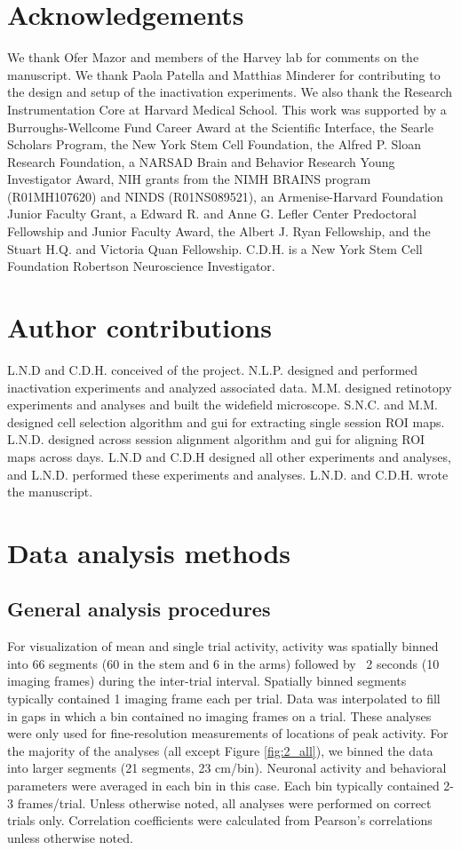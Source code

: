 \section{Acknowledgements}
We thank Ofer Mazor and members of the Harvey lab for comments on the manuscript. We thank Paola Patella and Matthias Minderer for contributing to the design and setup of the inactivation experiments. We also thank the Research Instrumentation Core at Harvard Medical School. This work was supported by a Burroughs-Wellcome Fund Career Award at the Scientific Interface, the Searle Scholars Program, the New York Stem Cell Foundation, the Alfred P. Sloan Research Foundation, a NARSAD Brain and Behavior Research Young Investigator Award, NIH grants from the NIMH BRAINS program (R01MH107620) and NINDS (R01NS089521), an Armenise-Harvard Foundation Junior Faculty Grant, a Edward R. and Anne G. Lefler Center Predoctoral Fellowship and Junior Faculty Award, the Albert J. Ryan Fellowship, and the Stuart H.Q. and Victoria Quan Fellowship. C.D.H. is a New York Stem Cell Foundation Robertson Neuroscience Investigator. 

\section{Author contributions}
L.N.D and C.D.H. conceived of the project. N.L.P. designed and performed inactivation experiments and analyzed associated data. M.M. designed retinotopy experiments and analyses and built the widefield microscope. S.N.C. and M.M. designed cell selection algorithm and gui for extracting single session ROI maps. L.N.D. designed across session alignment algorithm and gui for aligning ROI maps across days. L.N.D and C.D.H designed all other experiments and analyses, and L.N.D. performed these experiments and analyses. L.N.D. and C.D.H. wrote the manuscript. 

\section{Data analysis methods}
\subsection{General analysis procedures}
For visualization of mean and single trial activity, activity was spatially binned into 66 segments (60 in the stem and 6 in the arms) followed by ~2 seconds (10 imaging frames) during the inter-trial interval. Spatially binned segments typically contained 1 imaging frame each per trial. Data was interpolated to fill in gaps in which a bin contained no imaging frames on a trial. These analyses were only used for fine-resolution measurements of locations of peak activity. For the majority of the analyses (all except Figure \ref{fig:2_all}), we binned the data into larger segments (21 segments, 23 cm/bin). Neuronal activity and behavioral parameters were averaged in each bin in this case. Each bin typically contained 2-3 frames/trial. Unless otherwise noted, all analyses were performed on correct trials only. Correlation coefficients were calculated from Pearson's correlations unless otherwise noted.

